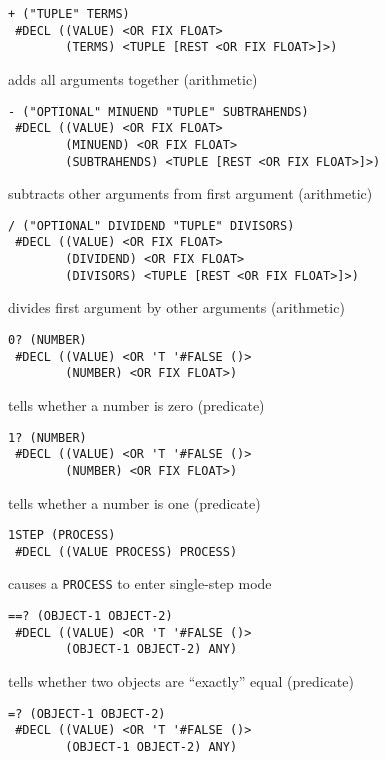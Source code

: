 \documentclass[a4paper]{scrbook}
\begin{document}
\begin{verbatim}
+ ("TUPLE" TERMS)
 #DECL ((VALUE) <OR FIX FLOAT>
        (TERMS) <TUPLE [REST <OR FIX FLOAT>]>)
\end{verbatim}

adds all arguments together (arithmetic)

\begin{verbatim}
- ("OPTIONAL" MINUEND "TUPLE" SUBTRAHENDS)
 #DECL ((VALUE) <OR FIX FLOAT>
        (MINUEND) <OR FIX FLOAT>
        (SUBTRAHENDS) <TUPLE [REST <OR FIX FLOAT>]>)
\end{verbatim}

subtracts other arguments from first argument (arithmetic)

\begin{verbatim}
/ ("OPTIONAL" DIVIDEND "TUPLE" DIVISORS)
 #DECL ((VALUE) <OR FIX FLOAT>
        (DIVIDEND) <OR FIX FLOAT>
        (DIVISORS) <TUPLE [REST <OR FIX FLOAT>]>)
\end{verbatim}

divides first argument by other arguments (arithmetic)

\begin{verbatim}
0? (NUMBER)
 #DECL ((VALUE) <OR 'T '#FALSE ()>
        (NUMBER) <OR FIX FLOAT>)
\end{verbatim}

tells whether a number is zero (predicate)

\begin{verbatim}
1? (NUMBER)
 #DECL ((VALUE) <OR 'T '#FALSE ()>
        (NUMBER) <OR FIX FLOAT>)
\end{verbatim}

tells whether a number is one (predicate)

\begin{verbatim}
1STEP (PROCESS)
 #DECL ((VALUE PROCESS) PROCESS)
\end{verbatim}

causes a \texttt{PROCESS} to enter single-step mode

\begin{verbatim}
==? (OBJECT-1 OBJECT-2)
 #DECL ((VALUE) <OR 'T '#FALSE ()>
        (OBJECT-1 OBJECT-2) ANY)
\end{verbatim}

tells whether two objects are ``exactly'' equal (predicate)

\begin{verbatim}
=? (OBJECT-1 OBJECT-2)
 #DECL ((VALUE) <OR 'T '#FALSE ()>
        (OBJECT-1 OBJECT-2) ANY)
\end{verbatim}
\end{document}
